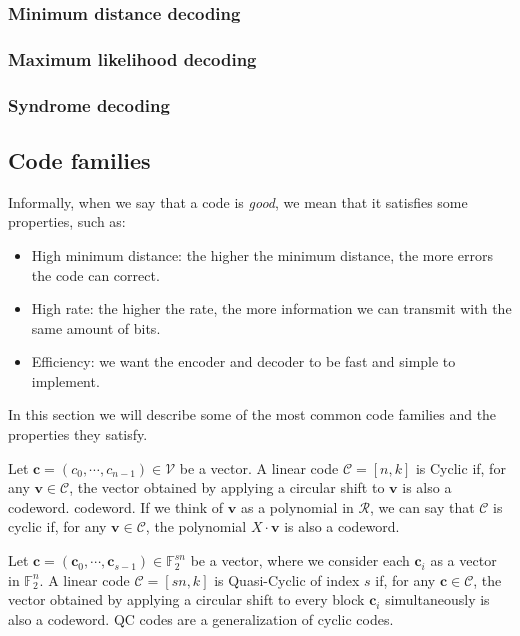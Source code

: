    \subsubsection{Minimum distance decoding}
    \subsubsection{Maximum likelihood decoding}
    \subsubsection{Syndrome decoding}


\subsection{Code families}
Informally, when we say that a code is \textit{good}, we mean that it satisfies some properties, such as:
\begin{itemize}
    \item High minimum distance: the higher the minimum distance, the more errors the code can correct.
    \item High rate: the higher the rate, the more information we can transmit with the same amount of bits.
    \item Efficiency: we want the encoder and decoder to be fast and simple to implement.
\end{itemize}
In this section we will describe some of the most common code families and the properties they satisfy.

\begin{definition}
    Let $\mathbf{c} = (c_0, \cdots, c_{n-1}) \in \mathcal{V}$ be a vector. A linear code $\mathcal{C} = [n, k]$ is Cyclic
    if, for any $\mathbf{v} \in \mathcal{C}$, the vector obtained by applying a circular shift to $\mathbf{v}$ is also a codeword.
    codeword. If we think of $\mathbf{v}$ as a polynomial in $\mathcal{R}$, we can say that $\mathcal{C}$ is cyclic if,
    for any $\mathbf{v} \in \mathcal{C}$, the polynomial $X \cdot \mathbf{v}$ is also a codeword.
\end{definition}

\begin{definition}
    Let $\mathbf{c} = (\mathbf{c}_0, \cdots, \mathbf{c}_{s-1}) \in \mathds{F}_2^{sn}$ be a vector, where we consider 
    each $\mathbf{c}_i$ as a vector in $\mathds{F}_2^n$.
    A linear code $\mathcal{C} = [sn,k]$ is Quasi-Cyclic of index $s$ if, for any $\mathbf{c} \in \mathcal{C}$, 
    the vector obtained by applying a circular shift to every block $\mathbf{c}_i$ simultaneously is also a codeword.
    QC codes are a generalization of cyclic codes.
\end{definition}

